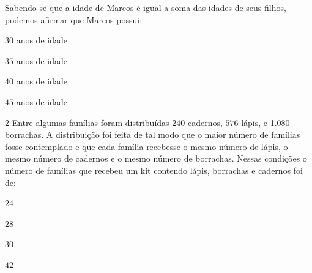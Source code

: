 Sabendo-se que a idade de Marcos é igual a soma das idades de seus
filhos, podemos afirmar que Marcos possui:

\begin{escolha}
\item $30$ anos de idade
\item $35$ anos de idade
\item $40$ anos de idade
\item $45$ anos de idade
\end{escolha}



\num{2}  Entre algumas famílias foram distribuídas $240$ cadernos, $576$ lápis, e
1.080 borrachas. A distribuição foi feita de tal modo que o maior número
de famílias fosse contemplado e que cada família recebesse o mesmo
número de lápis, o mesmo número de cadernos e o mesmo número de
borrachas. Nessas condições o número de famílias que recebeu um kit
contendo lápis, borrachas e cadernos foi de:

\begin{escolha}
\item $24$
\item $28$
\item $30$
\item $42$
\end{escolha}


